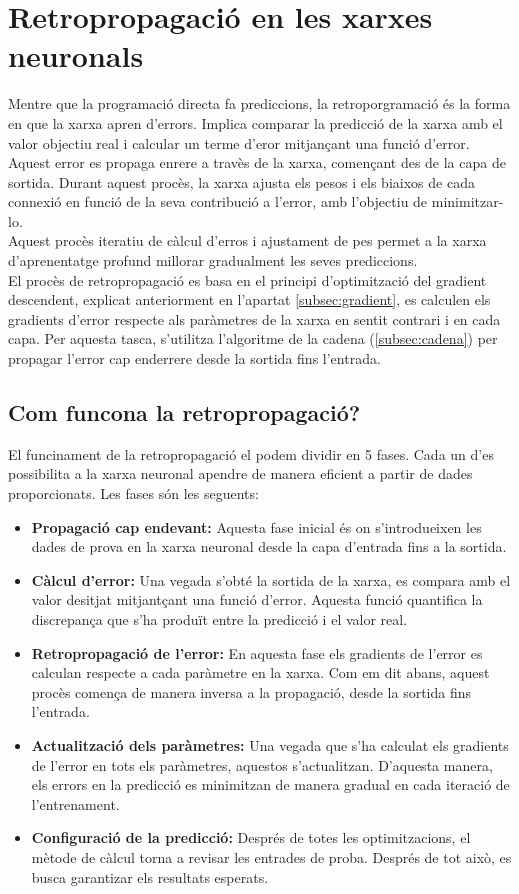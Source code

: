 \section{Retropropagació en les xarxes neuronals}\label{subsec:retropropagació}
Mentre que la programació directa fa prediccions, la retroporgramació és la forma en que la xarxa apren d'errors. Implica comparar la predicció de la xarxa amb el valor objectiu real i calcular un terme d'eror mitjançant una funció d'error.\\
Aquest error es propaga enrere a travès de la xarxa, començant des de la capa de sortida. Durant aquest procès, la xarxa ajusta els pesos i els biaixos de cada connexió en funció de la seva contribució a l'error, amb l'objectiu de minimitzar-lo.\\
Aquest procès iteratiu de càlcul d'erros i ajustament de pes permet a la xarxa d'aprenentatge profund millorar gradualment les seves prediccions.\\
El procès de retropropagació es basa en el principi d'optimització del gradient descendent, explicat anteriorment en l'apartat \ref{subsec:gradient}, es calculen els gradients d'error respecte als paràmetres de la xarxa en sentit contrari i en cada capa. Per aquesta tasca, s'utilitza l'algoritme de la cadena (\ref{subsec:cadena}) per propagar l'error cap enderrere desde la sortida fins l'entrada.

\subsection{Com funcona la retropropagació?}
El funcinament de la retropropagació el podem dividir en 5 fases. Cada un d'es possibilita a la xarxa neuronal apendre de manera eficient a partir de dades proporcionats. Les fases són les seguents:
\begin{itemize}
 \item \textbf{Propagació cap endevant:} Aquesta fase inicial és on s'introdueixen les dades de prova en la xarxa neuronal desde la capa d'entrada fins a la sortida.
 \item \textbf{Càlcul d'error:} Una vegada s'obté la sortida de la xarxa, es compara amb el valor desitjat mitjantçant una funció d'error. Aquesta funció quantifica la discrepança que s'ha produït entre la predicció i el valor real.
 \item \textbf{Retropropagació de l'error:} En aquesta fase els gradients de l'error es calculan respecte a cada paràmetre en la xarxa. Com em dit abans, aquest procès comença de manera inversa a la propagació, desde la sortida fins l'entrada.
 \item \textbf{Actualització dels paràmetres:} Una vegada que s'ha calculat els gradients de l'error en tots els paràmetres, aquestos s'actualitzan. D'aquesta manera, els errors en la predicció es minimitzan de manera gradual en cada iteració de l'entrenament.
 \item \textbf{Configuració de la predicció:} Després de totes les optimitzacions, el mètode de càlcul torna a revisar les entrades de proba. Després de tot això, es busca garantizar els resultats esperats.
\end{itemize}

